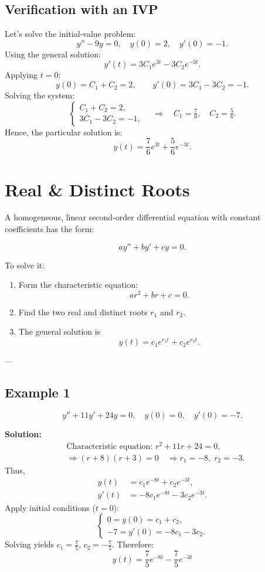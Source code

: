 \documentclass[12pt]{book}
\begin{document}
\subsection*{Verification with an IVP}
Let’s solve the initial-value problem:
\[
y'' - 9y = 0,
\quad
y(0) = 2,
\quad
y'(0) = -1.
\]
Using the general solution:
\[
y'(t) = 3C_1 e^{3t} - 3C_2 e^{-3t}.
\]
Applying \(t = 0\):
\[
y(0) = C_1 + C_2 = 2,
\qquad
y'(0) = 3C_1 - 3C_2 = -1.
\]
Solving the system:
\[
\begin{cases}
C_1 + C_2 = 2,\\
3C_1 - 3C_2 = -1,
\end{cases}
\quad\Longrightarrow\quad
C_1 = \tfrac{7}{6},\quad C_2 = \tfrac{5}{6}.
\]
Hence, the particular solution is:
\[
\boxed{y(t) = \frac{7}{6} e^{3t} + \frac{5}{6} e^{-3t}}.
\]

\section{Real \& Distinct Roots}

A homogeneous, linear second-order differential equation with constant coefficients has the form:

\[
a y'' + b y' + c y = 0.
\]

To solve it:
\begin{enumerate}
  \item Form the characteristic equation:
  \[
  a r^2 + b r + c = 0.
  \]
  \item Find the two real and distinct roots \(r_1\) and \(r_2\).
  \item The general solution is
  \[
  y(t) = c_1 e^{r_1 t} + c_2 e^{r_2 t}.
  \]
\end{enumerate}

---

\subsection*{Example 1}
\[
y'' + 11y' + 24y = 0, \quad y(0) = 0, \quad y'(0) = -7.
\]

\textbf{Solution:}
\[
\begin{aligned}
&\text{Characteristic equation: } r^2 + 11r + 24 = 0,\\
&\Rightarrow (r + 8)(r + 3) = 0 \quad \Longrightarrow r_1 = -8,\; r_2 = -3.
\end{aligned}
\]
Thus,
\[
\begin{aligned}
y(t) &= c_1 e^{-8t} + c_2 e^{-3t},\\
y'(t) &= -8 c_1 e^{-8t} - 3 c_2 e^{-3t}.
\end{aligned}
\]
Apply initial conditions (\(t=0\)):
\[
\begin{cases}
0 = y(0) = c_1 + c_2, \\
-7 = y'(0) = -8c_1 - 3c_2.
\end{cases}
\]
Solving yields \(c_1 = \tfrac{7}{5}\), \(c_2 = -\tfrac{7}{5}\). Therefore:
\[
\boxed{y(t) = \frac{7}{5}e^{-8t} - \frac{7}{5}e^{-3t}}
\]
\end{document}
